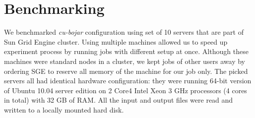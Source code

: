 \section{Benchmarking}

We benchmarked \emph{cu-bojar} configuration using set of 10 servers that are part of Sun Grid Engine cluster.
Using multiple machines allowed us to speed up experiment process by running jobs with different setup at once.
Although these machines were standard nodes in a cluster, we kept jobs of other users away by ordering SGE
to reserve all memory of the machine for our job only.
The picked servers all had identical hardware configuration: they were running 64-bit version of
Ubuntu 10.04 server edition on 2 Core4 Intel Xeon 3 GHz processors (4 cores in total) with 32 GB of RAM.
All the input and output files were read and written to a locally mounted hard disk.
